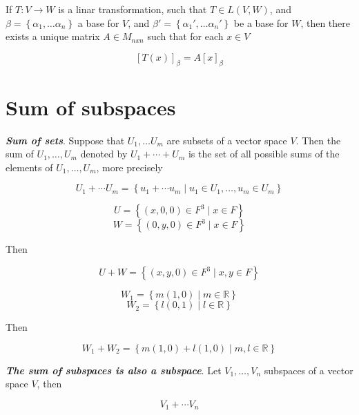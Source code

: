 \documentclass{report}
\begin{document}
    \begin{thBox}
        If $T: V \to W$ is a linar transformation, such that $T \in L(V, W)$, and $\beta = \left\{ \alpha_1, \dots \alpha_n \right\}$ a base for $V$, and $\beta' = \left\{ \alpha_1', \dots \alpha_n' \right\}$ be a base for $W$, then there exists a unique matrix $A \in M_{nxn}$ such that for each $x \in V$

        $$[T(x)]_\beta = A[x]_\beta$$
    \end{thBox}

    \section{Sum of subspaces}

    \begin{defBox}
        \textit{\textbf{Sum of sets}}. Suppose that $U_1, \dots U_m$ are subsets of a vector space $V$. Then the sum of $U_1, \dots , U_m$ denoted by $U_1 + \cdots + U_m $ is the set of all possible sums of the elements of $U_1, \dots , U_m$, more precisely

        $$U_1 + \cdots U_m = \left\{ u_1 + \cdots u_m \mid u_1 \in U_1 , \dots , u_m \in U_m \right\}$$
    \end{defBox}

    \begin{Example}
        $$U = \left\{ (x, 0, 0) \in F^3 \mid x \in F \right\}$$
        $$W = \left\{ (0, y, 0) \in F^3 \mid x \in F \right\}$$

        Then

        $$U + W = \left\{ (x, y, 0) \in F^3 \mid x, y \in F \right\}$$
    \end{Example}

    \begin{Example}
        $$W_1 = \left\{ m(1,0) \mid m \in \mathbb{R} \right\}$$
        $$W_2 = \left\{ l(0,1) \mid l \in \mathbb{R} \right\}$$

        Then

        $$W_1 + W_2 = \left\{ m(1,0) + l(1,0) \mid m, l \in \mathbb{R} \right\}$$
    \end{Example}

    \begin{thBox}
        \textit{\textbf{The sum of subspaces is also a subspace}}. Let $V_1, \dots , V_n$ subspaces of a vector space $V$, then

        $$ V_1 + \cdots V_n $$
    \end{thBox}
\end{document}
